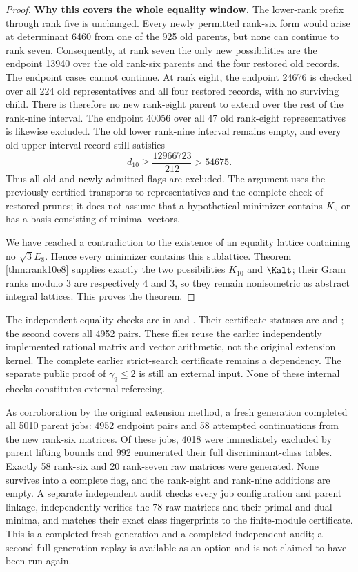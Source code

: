 \begin{proof}
\textbf{Why this covers the whole equality window.}
The lower-rank prefix through rank five is unchanged. Every newly permitted rank-six form would arise at determinant 6460 from one of the 925 old parents, but none can continue to rank seven. Consequently, at rank seven the only new possibilities are the endpoint 13940 over the old rank-six parents and the four restored old records. The endpoint cases cannot continue. At rank eight, the endpoint 24676 is checked over all 224 old representatives and all four restored records, with no surviving child. There is therefore no new rank-eight parent to extend over the rest of the rank-nine interval. The endpoint 40056 over all 47 old rank-eight representatives is likewise excluded. The old lower rank-nine interval remains empty, and every old upper-interval record still satisfies
\[
d_{10}\ge\frac{12966723}{212}>54675.
\]
Thus all old and newly admitted flags are excluded. The argument uses the previously certified transports to representatives and the complete check of restored prunes; it does not assume that a hypothetical minimizer contains $K_9$ or has a basis consisting of minimal vectors.

We have reached a contradiction to the existence of an equality lattice containing no $\sqrt3E_8$. Hence every minimizer contains this sublattice. Theorem \ref{thm:rank10e8} supplies exactly the two possibilities $K_{10}$ and $\Kalt$; their Gram ranks modulo 3 are respectively 4 and 3, so they remain nonisometric as abstract integral lattices. This proves the theorem.
\end{proof}

The independent equality checks are in  and . Their certificate statuses are  and ; the second covers all 4952 pairs. These files reuse the earlier independently implemented rational matrix and vector arithmetic, not the original extension kernel. The complete earlier strict-search certificate remains a dependency. The separate public proof of $\gamma_9\le2$ is still an external input. None of these internal checks constitutes external refereeing.

As corroboration by the original extension method, a fresh generation completed all 5010 parent jobs: 4952 endpoint pairs and 58 attempted continuations from the new rank-six matrices. Of these jobs, 4018 were immediately excluded by parent lifting bounds and 992 enumerated their full discriminant-class tables. Exactly 58 rank-six and 20 rank-seven raw matrices were generated. None survives into a complete flag, and the rank-eight and rank-nine additions are empty. A separate independent audit checks every job configuration and parent linkage, independently verifies the 78 raw matrices and their primal and dual minima, and matches their exact class fingerprints to the finite-module certificate. This is a completed fresh generation and a completed independent audit; a second full generation replay is available as an option and is not claimed to have been run again.

